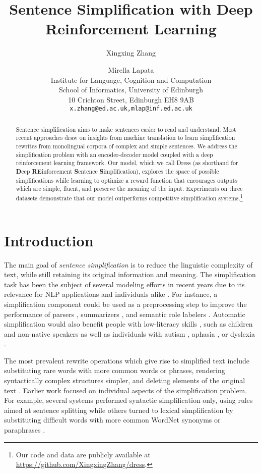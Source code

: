 \documentclass[11pt,letterpaper]{article}
\title{Sentence Simplification with Deep Reinforcement Learning}
\date{}
\author{Xingxing Zhang \and Mirella Lapata \\
	Institute for Language, Cognition and Computation
	\\
	School of Informatics, University of Edinburgh
	\\ 
	10 Crichton Street, Edinburgh EH8 9AB \\
	{\tt x.zhang@ed.ac.uk,mlap@inf.ed.ac.uk}
}
\date{}
\begin{document}
\maketitle

\begin{abstract}
  Sentence simplification aims to make sentences easier to read and
  understand. Most recent approaches draw on insights from machine
  translation to learn simplification rewrites from monolingual
  corpora of complex and simple sentences. We address the
  simplification problem with an encoder-decoder model coupled with a
  deep reinforcement learning framework. Our model, which we call {\sc
    Dress} (as shorthand for {\bf D}eep {\bf RE}inforcement {\bf
    S}entence {\bf S}implification), explores the space of possible
  simplifications while learning to optimize a reward function that
  encourages outputs which are simple, fluent, and preserve the
  meaning of the input. Experiments on three datasets demonstrate that
  our model outperforms competitive simplification
  systems.\footnote{Our code and data are publicly available at
    \url{https://github.com/XingxingZhang/dress}.}
	
\end{abstract}


\section{Introduction}
\label{sec:introduction}
The main goal of \emph{sentence simplification} is to reduce the
linguistic complexity of text, while still retaining its original
information and meaning.  The simplification task has been the subject
of several modeling efforts in recent years due to its relevance for
NLP applications and individuals alike
\cite{Siddharthan:2014,Shardlow:2014}. For instance, a simplification
component could be used as a preprocessing step to improve the
performance of parsers \cite{Chandrasekar:ea:96}, summarizers
\cite{Klebanov:ea:04}, and semantic role labelers
\cite{vickrey-koller:2008:ACLMain,Woodsend:Lapata:2014}. Automatic
simplification would also benefit people with low-literacy skills
\cite{Watanabe:ea:09}, such as children and non-native speakers as
well as individuals with autism \cite{Evans:ea:2014}, aphasia
\cite{Carroll:ea:99}, or dyslexia \cite{Rello:ea:2013}.

The most prevalent rewrite operations which give rise to simplified
text include substituting rare words with more common words or
phrases, rendering syntactically complex structures simpler, and
deleting elements of the original text
\cite{Siddharthan:2014}. Earlier work focused on individual aspects of
the simplification problem. For example, several systems performed
syntactic simplification only, using rules aimed at sentence splitting
\citep{Carroll:ea:99,Chandrasekar:ea:96,vickrey-koller:2008:ACLMain,Siddharthan:06}
while others turned to lexical simplification by substituting
difficult words with more common WordNet synonyms or paraphrases
\citep{Devlin:1999,inui-EtAl:2003:PARAPHRASE,kaji-EtAl:2002:ACL}. 
\end{document}
